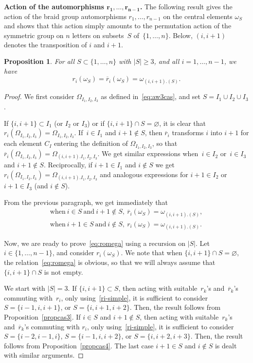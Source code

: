 \documentclass[10pt,a4paper]{amsart}
\numberwithin{equation}{section}
\newtheorem{prop}[theo]{Proposition}
\theoremstyle{definition}
\newcommand{\rb}{\overline{r}}
\begin{document}
{\bf Action of the automorphisms $\boldsymbol{r_1,\ldots,r_{n-1}}$.} The following result gives the action of the braid group automorphisms $r_1,\dots,r_{n-1}$ on the central elements $\omega_S$ and shows that this action simply amounts to the permutation action of the symmetric group on $n$ letters on subsets~$S$ of~$\{1,\dots,n\}$. Below, $(i,i+1)$ denotes the transposition of $i$ and $i+1$.

\begin{prop}\label{prop:romega}
For all $S\subset \{1,\dots,n\}$ with $|S|\geq 3$, and all $i=1,\dots,n-1$, we have
\begin{equation}\label{eq:romega}
r_i(\omega_S)=\rb_i(\omega_S)=\omega_{(i,i+1).(S)}.
\end{equation}
\end{prop}
\begin{proof}
We first consider $\varOmega_{I_1,I_2,I_3}$ as defined in~\eqref{eq:aw3cas}, and set $S=I_1\cup I_2\cup I_3$.

If $\{i,i+1\}\subset I_1$ (or $I_2$ or $I_3$) or if $\{i,i+1\}\cap S=\varnothing$, it is clear that $r_i(\varOmega_{I_1,I_2,I_3})=\varOmega_{I_1,I_2,I_3}$.
If~$i\in I_1$ and $i+1\not\in S$, then $\rb_i$ transforms $i$ into $i+1$ for each element $C_I$ entering the definition of
$\varOmega_{I_1,I_2,I_3}$, so that $\rb_i(\varOmega_{I_1,I_2,I_3})=\varOmega_{(i,i+1).I_1,I_2,I_3}$.
We get similar expressions when~$i\in I_2$ or~$i\in I_3$ and $i+1\not\in S$.
Reciprocally, if $i+1\in I_1$ and $i\not\in S$ we get $r_i(\varOmega_{I_1,I_2,I_3})=\varOmega_{(i,i+1).I_1,I_2,I_3}$ and analogous expressions for
$i+1\in I_2$ or $i+1\in I_3$ (and $i\not\in S$).

From the previous paragraph, we get immediately that
\begin{gather}
\text{when}\ i\in S \ \text{and} \ i+1\not\in S,\ \rb_i(\omega_S)=\omega_{(i,i+1).(S)}, \nonumber\\
\text{when}\ i+1\in S \ \text{and} \ i\not\in S,\ r_i(\omega_S)=\omega_{(i,i+1).(S)}.\label{ri-simple}
\end{gather}

Now, we are ready to prove~\eqref{eq:romega} using a recursion on $|S|$. Let $i\in\{1,\dots, n-1\}$, and consider $r_i(\omega_S)$.
We note that when $\{i,i+1\}\cap S=\varnothing$, the relation~\eqref{eq:romega} is obvious, so that we will always assume that $\{i,i+1\}\cap S$ is not empty.

We start with $|S|=3$. If $\{i,i+1\}\subset S$, then acting with suitable~$r_k$'s and~$\rb_k$'s commuting with~$r_i$, only using~\eqref{ri-simple}, it is sufficient to consider $S=\{i-1,i,i+1\}$, or $S=\{i,i+1,i+2\}$. Then, the result follows from Proposition~\ref{propcas3}.
If $i\in S$ and $i+1\not\in S$, then acting with suitable~$r_k$'s and~$\rb_k$'s commuting with $r_i$, only using~\eqref{ri-simple}, it is sufficient to consider $S=\{i-2,i-1,i\}$, $S=\{i-1,i,i+2\}$, or $S=\{i,i+2,i+3\}$. Then, the result follows from Proposition~\ref{propcas4}. The last case $i+1\in S$ and $i\not\in S$ is dealt with similar arguments.


\end{proof}
\end{document}
